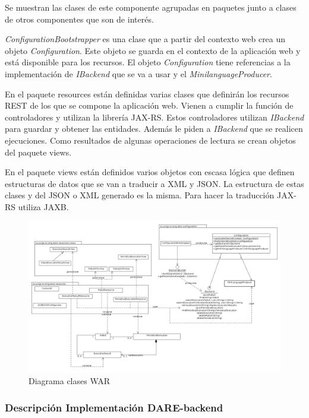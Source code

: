 Se muestran las clases de este componente agrupadas en paquetes junto
a clases de otros componentes que son de interés.

\emph{ConfigurationBootstrapper} es una clase que a partir del
contexto web crea un objeto \emph{Configuration}. Este objeto se
guarda en el contexto de la aplicación web y está disponible para los
recursos. El objeto \emph{Configuration} tiene referencias a la
implementación de \emph{IBackend} que se va a usar y el
\emph{MinilanguageProducer}.

En el paquete resources están definidas varias clases que definirán
los recursos REST de los que se compone la aplicación web. Vienen a
cumplir la función de controladores y utilizan la librería
JAX-RS. Estos controladores utilizan \emph{IBackend} para guardar y
obtener las entidades. Además le piden a \emph{IBackend} que se
realicen ejecuciones. Como resultados de algunas operaciones de
lectura se crean objetos del paquete views.

En el paquete views están definidos varios objetos con escasa lógica
que definen estructuras de datos que se van a traducir a XML y
JSON. La estructura de estas clases y del JSON o XML generado es la
misma. Para hacer la traducción JAX-RS utiliza JAXB\cite{JAXB}.

\begin{landscape}
\begin{figure}[hp]
\includegraphics[width=1.4\textwidth]{chapters/technical-manual/diagrams/clases_war.png}
\caption{Diagrama clases WAR}\label{diagrama_clases_war}
\end{figure}
\end{landscape}

\subsubsection{Descripción Implementación DARE-backend}

